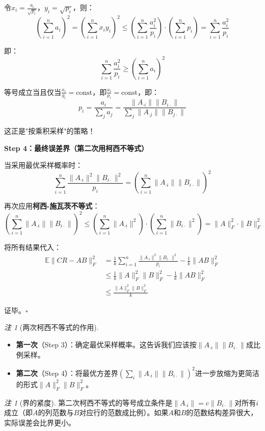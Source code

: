 \documentclass[11pt,a4paper]{ctexart}
\theoremstyle{definition}
\theoremstyle{remark}
\newtheorem{remark}[theorem]{注}
\begin{document}
令$x_i = \frac{a_i}{\sqrt{p_i}}$，$y_i = \sqrt{p_i}$，则：
\[
\left(\sum_{i=1}^n a_i\right)^2 = \left(\sum_{i=1}^n x_i y_i\right)^2 \leq \left(\sum_{i=1}^n \frac{a_i^2}{p_i}\right) \cdot \left(\sum_{i=1}^n p_i\right) = \sum_{i=1}^n \frac{a_i^2}{p_i}
\]

即：
\[
\sum_{i=1}^n \frac{a_i^2}{p_i} \geq \left(\sum_{i=1}^n a_i\right)^2
\]

等号成立当且仅当$\frac{x_i}{y_i} = \text{const}$，即$\frac{a_i}{p_i} = \text{const}$，即：
\[
p_i = \frac{a_i}{\sum_j a_j} = \frac{\|A_{\cdot i}\| \|B_{i\cdot}\|}{\sum_j \|A_{\cdot j}\| \|B_{j\cdot}\|}
\]

这正是"按乘积采样"的策略！

\textbf{Step 4：最终误差界（第二次用柯西不等式）}

当采用最优采样概率时：
\[
\sum_{i=1}^n \frac{\|A_{\cdot i}\|^2 \|B_{i\cdot}\|^2}{p_i} = \left(\sum_{i=1}^n \|A_{\cdot i}\| \|B_{i\cdot}\|\right)^2
\]

再次应用\textbf{柯西-施瓦茨不等式}：
\[
\left(\sum_{i=1}^n \|A_{\cdot i}\| \|B_{i\cdot}\|\right)^2 \leq \left(\sum_{i=1}^n \|A_{\cdot i}\|^2\right) \cdot \left(\sum_{i=1}^n \|B_{i\cdot}\|^2\right) = \|A\|_F^2 \cdot \|B\|_F^2
\]

将所有结果代入：
\begin{align*}
\mathbb{E}\|CR - AB\|_F^2 &= \frac{1}{k}\sum_{i=1}^n \frac{\|A_{\cdot i}\|^2 \|B_{i\cdot}\|^2}{p_i} - \frac{1}{k}\|AB\|_F^2 \\
&\leq \frac{1}{k} \|A\|_F^2 \|B\|_F^2 - \frac{1}{k}\|AB\|_F^2 \\
&\leq \frac{\|A\|_F^2 \|B\|_F^2}{k}
\end{align*}

证毕。$\square$

\begin{remark}[两次柯西不等式的作用]
\begin{itemize}
    \item \textbf{第一次}（Step 3）：确定最优采样概率。这告诉我们应该按$\|A_{\cdot i}\| \|B_{i\cdot}\|$成比例采样。
    \item \textbf{第二次}（Step 4）：将最优方差界$(\sum_i \|A_{\cdot i}\| \|B_{i\cdot}\|)^2$进一步放缩为更简洁的形式$\|A\|_F^2 \|B\|_F^2$。
\end{itemize}
\end{remark}

\begin{remark}[界的紧度]
第二次柯西不等式的等号成立条件是$\|A_{\cdot i}\| = c \|B_{i\cdot}\|$对所有$i$成立（即$A$的列范数与$B$对应行的范数成比例）。如果$A$和$B$的范数结构差异很大，实际误差会比界更小。
\end{remark}
\end{document}
